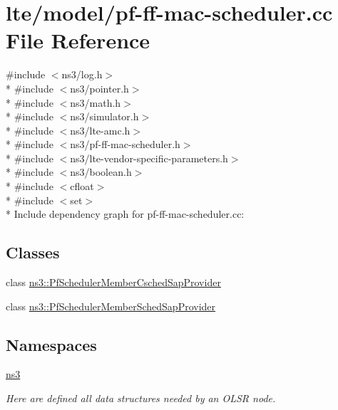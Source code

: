 \hypertarget{lte_2model_2pf-ff-mac-scheduler_8cc}{}\section{lte/model/pf-\/ff-\/mac-\/scheduler.cc File Reference}
\label{lte_2model_2pf-ff-mac-scheduler_8cc}
{\ttfamily \#include $<$ns3/log.\+h$>$}\\*
{\ttfamily \#include $<$ns3/pointer.\+h$>$}\\*
{\ttfamily \#include $<$ns3/math.\+h$>$}\\*
{\ttfamily \#include $<$ns3/simulator.\+h$>$}\\*
{\ttfamily \#include $<$ns3/lte-\/amc.\+h$>$}\\*
{\ttfamily \#include $<$ns3/pf-\/ff-\/mac-\/scheduler.\+h$>$}\\*
{\ttfamily \#include $<$ns3/lte-\/vendor-\/specific-\/parameters.\+h$>$}\\*
{\ttfamily \#include $<$ns3/boolean.\+h$>$}\\*
{\ttfamily \#include $<$cfloat$>$}\\*
{\ttfamily \#include $<$set$>$}\\*
Include dependency graph for pf-\/ff-\/mac-\/scheduler.cc\+:
\subsection*{Classes}
\begin{DoxyCompactItemize}
\item 
class \hyperlink{classns3_1_1PfSchedulerMemberCschedSapProvider}{ns3\+::\+Pf\+Scheduler\+Member\+Csched\+Sap\+Provider}
\item 
class \hyperlink{classns3_1_1PfSchedulerMemberSchedSapProvider}{ns3\+::\+Pf\+Scheduler\+Member\+Sched\+Sap\+Provider}
\end{DoxyCompactItemize}
\subsection*{Namespaces}
\begin{DoxyCompactItemize}
\item 
 \hyperlink{namespacens3}{ns3}
\begin{DoxyCompactList}\small\item\em Here are defined all data structures needed by an O\+L\+SR node. \end{DoxyCompactList}\end{DoxyCompactItemize}
